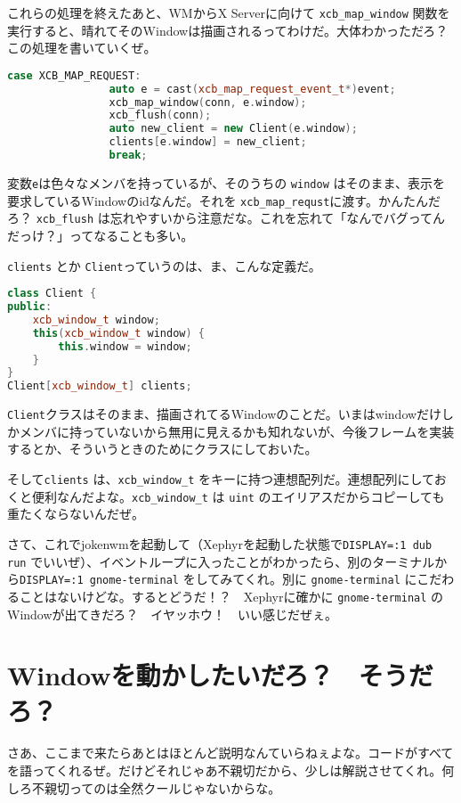 \documentclass[12pt,a4paper]{jsarticle}
\begin{document}
これらの処理を終えたあと、WMからX Serverに向けて \lstinline{xcb_map_window} 関数を実行すると、晴れてそのWindowは描画されるってわけだ。大体わかっただろ？　この処理を書いていくぜ。

\begin{lstlisting}[language=C++]
case XCB_MAP_REQUEST:
				auto e = cast(xcb_map_request_event_t*)event;
				xcb_map_window(conn, e.window);
				xcb_flush(conn);
                auto new_client = new Client(e.window);
                clients[e.window] = new_client;
				break;
\end{lstlisting}

変数\lstinline{e}は色々なメンバを持っているが、そのうちの \lstinline{window} はそのまま、表示を要求しているWindowのidなんだ。それを \lstinline{xcb_map_requst}に渡す。かんたんだろ？ \lstinline{xcb_flush} は忘れやすいから注意だな。これを忘れて「なんでバグってんだっけ？」ってなることも多い。

\lstinline{clients} とか \lstinline{Client}っていうのは、ま、こんな定義だ。

\begin{lstlisting}[language=C++]
class Client {
public:
	xcb_window_t window;
	this(xcb_window_t window) {
		this.window = window;
	}
}
Client[xcb_window_t] clients;
\end{lstlisting}

\lstinline{Client}クラスはそのまま、描画されてるWindowのことだ。いまはwindowだけしかメンバに持っていないから無用に見えるかも知れないが、今後フレームを実装するとか、そういうときのためにクラスにしておいた。

そして\lstinline{clients} は、\lstinline{xcb_window_t} をキーに持つ連想配列だ。連想配列にしておくと便利なんだよな。\lstinline{xcb_window_t} は \lstinline{uint} のエイリアスだからコピーしても重たくならないんだぜ。

さて、これでjokenwmを起動して（Xephyrを起動した状態で\lstinline{DISPLAY=:1 dub run} でいいぜ）、イベントループに入ったことがわかったら、別のターミナルから\lstinline{DISPLAY=:1 gnome-terminal} をしてみてくれ。別に \lstinline{gnome-terminal} にこだわることはないけどな。するとどうだ！？　Xephyrに確かに \lstinline{gnome-terminal} のWindowが出てきだろ？　イヤッホウ！　いい感じだぜぇ。

\section{Windowを動かしたいだろ？　そうだろ？}

さあ、ここまで来たらあとはほとんど説明なんていらねぇよな。コードがすべてを語ってくれるぜ。だけどそれじゃあ不親切だから、少しは解説させてくれ。何しろ不親切ってのは全然クールじゃないからな。
\end{document}

